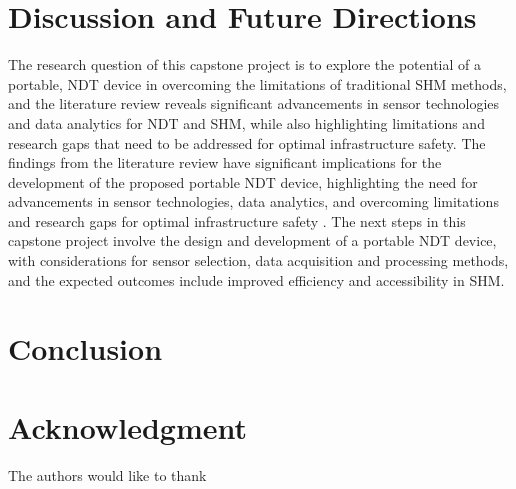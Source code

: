 \documentclass[journal, a4paper]{IEEEtran}
\begin{document}
\section{Discussion and Future Directions}  %
The research question of this capstone project is to explore the potential of a portable,
NDT device in overcoming the limitations of traditional SHM methods,
and the literature review reveals significant advancements in sensor technologies and data analytics for NDT and SHM,
while also highlighting limitations and research gaps that need to be addressed for optimal infrastructure safety.
The findings from the literature review have significant implications for the development of the
proposed portable NDT device, highlighting the need for advancements in sensor technologies,
data analytics, and overcoming limitations and research gaps for optimal infrastructure safety \cite{Udell2018} \cite{Meier2018}.
The next steps in this capstone project involve the design and development of a portable
NDT device, with considerations for sensor selection, data acquisition and processing methods,
and the expected outcomes include improved efficiency and accessibility in SHM.



\section{Conclusion}
\lipsum[1]


\section*{Acknowledgment}
The authors would like to thank \lipsum[1]



\ifCLASSOPTIONcaptionsoff
  \newpage
\fi






\end{document}
